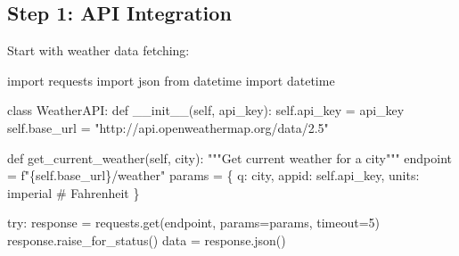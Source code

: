 \documentclass[
  letterpaper,
  DIV=11,
  numbers=noendperiod,
  oneside]{scrreprt}
\newenvironment{Shaded}{}{}
\newcommand{\CommentTok}[1]{\textcolor[rgb]{0.42,0.45,0.49}{#1}}
\newcommand{\ControlFlowTok}[1]{\textcolor[rgb]{0.84,0.23,0.29}{#1}}
\newcommand{\DecValTok}[1]{\textcolor[rgb]{0.00,0.36,0.77}{#1}}
\newcommand{\FunctionTok}[1]{\textcolor[rgb]{0.44,0.26,0.76}{#1}}
\newcommand{\ImportTok}[1]{\textcolor[rgb]{0.01,0.18,0.38}{#1}}
\newcommand{\KeywordTok}[1]{\textcolor[rgb]{0.84,0.23,0.29}{#1}}
\newcommand{\NormalTok}[1]{\textcolor[rgb]{0.14,0.16,0.18}{#1}}
\newcommand{\OperatorTok}[1]{\textcolor[rgb]{0.14,0.16,0.18}{#1}}
\newcommand{\SpecialCharTok}[1]{\textcolor[rgb]{0.00,0.36,0.77}{#1}}
\newcommand{\SpecialStringTok}[1]{\textcolor[rgb]{0.01,0.18,0.38}{#1}}
\newcommand{\StringTok}[1]{\textcolor[rgb]{0.01,0.18,0.38}{#1}}
\newcommand{\VariableTok}[1]{\textcolor[rgb]{0.89,0.38,0.04}{#1}}
\begin{document}
\subsection{Step 1: API Integration}\label{step-1-api-integration}

Start with weather data fetching:

\begin{Shaded}
\begin{Highlighting}[]
\ImportTok{import}\NormalTok{ requests}
\ImportTok{import}\NormalTok{ json}
\ImportTok{from}\NormalTok{ datetime }\ImportTok{import}\NormalTok{ datetime}

\KeywordTok{class}\NormalTok{ WeatherAPI:}
    \KeywordTok{def} \FunctionTok{\_\_init\_\_}\NormalTok{(}\VariableTok{self}\NormalTok{, api\_key):}
        \VariableTok{self}\NormalTok{.api\_key }\OperatorTok{=}\NormalTok{ api\_key}
        \VariableTok{self}\NormalTok{.base\_url }\OperatorTok{=} \StringTok{"http://api.openweathermap.org/data/2.5"}
    
    \KeywordTok{def}\NormalTok{ get\_current\_weather(}\VariableTok{self}\NormalTok{, city):}
        \CommentTok{"""Get current weather for a city"""}
\NormalTok{        endpoint }\OperatorTok{=} \SpecialStringTok{f"}\SpecialCharTok{\{}\VariableTok{self}\SpecialCharTok{.}\NormalTok{base\_url}\SpecialCharTok{\}}\SpecialStringTok{/weather"}
\NormalTok{        params }\OperatorTok{=}\NormalTok{ \{}
            \StringTok{\textquotesingle{}q\textquotesingle{}}\NormalTok{: city,}
            \StringTok{\textquotesingle{}appid\textquotesingle{}}\NormalTok{: }\VariableTok{self}\NormalTok{.api\_key,}
            \StringTok{\textquotesingle{}units\textquotesingle{}}\NormalTok{: }\StringTok{\textquotesingle{}imperial\textquotesingle{}}  \CommentTok{\# Fahrenheit}
\NormalTok{        \}}
        
        \ControlFlowTok{try}\NormalTok{:}
\NormalTok{            response }\OperatorTok{=}\NormalTok{ requests.get(endpoint, params}\OperatorTok{=}\NormalTok{params, timeout}\OperatorTok{=}\DecValTok{5}\NormalTok{)}
\NormalTok{            response.raise\_for\_status()}
\NormalTok{            data }\OperatorTok{=}\NormalTok{ response.json()}
            

\end{Highlighting}
\end{Shaded}
\end{document}

